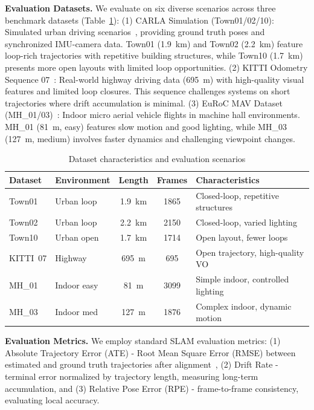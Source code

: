 \textbf{Evaluation Datasets.} We evaluate on six diverse scenarios across three benchmark datasets (Table~\ref{tab:datasets}): (1) CARLA Simulation (Town01/02/10): Simulated urban driving scenarios~\cite{dosovitskiy2017carla}, providing ground truth poses and synchronized IMU-camera data. Town01 (1.9~km) and Town02 (2.2~km) feature loop-rich trajectories with repetitive building structures, while Town10 (1.7~km) presents more open layouts with limited loop opportunities. (2) KITTI Odometry Sequence 07~\cite{geiger2012kitti}: Real-world highway driving data (695~m) with high-quality visual features and limited loop closures. This sequence challenges systems on short trajectories where drift accumulation is minimal. (3) EuRoC MAV Dataset (MH\_01/03)~\cite{burri2016euroc}: Indoor micro aerial vehicle flights in machine hall environments. MH\_01 (81~m, easy) features slow motion and good lighting, while MH\_03 (127~m, medium) involves faster dynamics and challenging viewpoint changes.

\begin{table}[t]
\centering
\setlength{\tabcolsep}{4pt}
\small
\caption{Dataset characteristics and evaluation scenarios}
\label{tab:datasets}
\begin{tabular}{@{}llccl@{}}
\toprule
Dataset & Environment & Length & Frames & Characteristics \\
\midrule
Town01 & Urban loop & 1.9~km & 1865 & Closed-loop, repetitive structures \\
Town02 & Urban loop & 2.2~km & 2150 & Closed-loop, varied lighting \\
Town10 & Urban open & 1.7~km & 1714 & Open layout, fewer loops \\
KITTI~07 & Highway & 695~m & 695 & Open trajectory, high-quality VO \\
MH\_01 & Indoor easy & 81~m & 3099 & Simple indoor, controlled lighting \\
MH\_03 & Indoor med & 127~m & 1876 & Complex indoor, dynamic motion \\
\bottomrule
\end{tabular}
\end{table}

\textbf{Evaluation Metrics.} We employ standard SLAM evaluation metrics: (1) Absolute Trajectory Error (ATE) - Root Mean Square Error (RMSE) between estimated and ground truth trajectories after alignment~\cite{sturm2012benchmark}, (2) Drift Rate - terminal error normalized by trajectory length, measuring long-term accumulation, and (3) Relative Pose Error (RPE) - frame-to-frame consistency, evaluating local accuracy.

